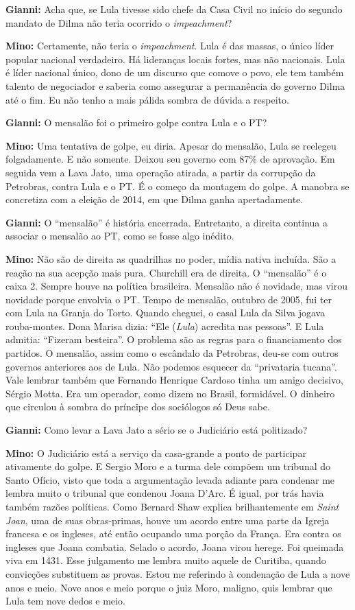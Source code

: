\textbf{Gianni:} Acha que, se Lula tivesse sido chefe da Casa Civil no
início do segundo mandato de Dilma não teria ocorrido o
\emph{impeachment}?

\textbf{Mino:} Certamente, não teria o \emph{impeachment}. Lula é das
massas, o único líder popular nacional verdadeiro. Há lideranças locais
fortes, mas não nacionais. Lula é líder nacional único, dono de um
discurso que comove o povo, ele tem também talento de negociador e
saberia como assegurar a permanência do governo Dilma até o fim. Eu não
tenho a mais pálida sombra de dúvida a respeito.

\textbf{Gianni:} O mensalão foi o primeiro golpe contra Lula e o PT?

\textbf{Mino:} Uma tentativa de golpe, eu diria. Apesar do mensalão,
Lula se reelegeu folgadamente. E não somente. Deixou seu governo com
87\% de aprovação. Em seguida vem a Lava Jato, uma operação atirada, a
partir da corrupção da Petrobras, contra Lula e o PT. É o começo da
montagem do golpe. A manobra se concretiza com a eleição de 2014, em que
Dilma ganha apertadamente.

\textbf{Gianni:} O ``mensalão'' é história encerrada. Entretanto, a
direita continua a associar o mensalão ao PT, como se fosse algo
inédito.

\textbf{Mino:} Não são de direita as quadrilhas no poder, mídia nativa
incluída. São a reação na sua acepção mais pura. Churchill era de
direita. O ``mensalão'' é o caixa 2. Sempre houve na política
brasileira. Mensalão não é novidade, mas virou novidade porque envolvia
o PT. Tempo de mensalão, outubro de 2005, fui ter com Lula na Granja do
Torto. Quando cheguei, o casal Lula da Silva jogava rouba-montes. Dona
Marisa dizia: ``Ele (\emph{Lula}) acredita nas pessoas''. E Lula
admitia: ``Fizeram besteira''. O problema são as regras para o
financiamento dos partidos. O mensalão, assim como o escândalo da
Petrobras, deu-se com outros governos anteriores aos de Lula. Não
podemos esquecer da ``privataria tucana''. Vale lembrar também que
Fernando Henrique Cardoso tinha um amigo decisivo, Sérgio Motta. Era um
operador, como dizem no Brasil, formidável. O dinheiro que circulou à
sombra do príncipe dos sociólogos só Deus sabe.

\textbf{Gianni:} Como levar a Lava Jato a sério se o Judiciário está
politizado?

\textbf{Mino:} O Judiciário está a serviço da casa-grande a ponto de
participar ativamente do golpe. E Sergio Moro e a turma dele compõem um
tribunal do Santo Ofício, visto que toda a argumentação levada adiante
para condenar me lembra muito o tribunal que condenou Joana D'Arc. É
igual, por trás havia também razões políticas. Como Bernard Shaw explica
brilhantemente em \emph{Saint Joan}, uma de suas obras-primas, houve um
acordo entre uma parte da Igreja francesa e os ingleses, até então
ocupando uma porção da França. Era contra os ingleses que Joana
combatia. Selado o acordo, Joana virou herege. Foi queimada viva em
1431. Esse julgamento me lembra muito aquele de Curitiba, quando
convicções substituem as provas. Estou me referindo à condenação de Lula
a nove anos e meio. Nove anos e meio porque o juiz Moro, maligno, quis
lembrar que Lula tem nove dedos e meio.


